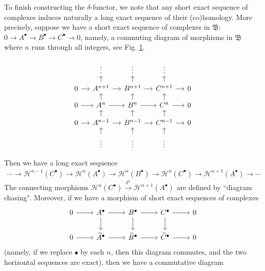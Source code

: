 \documentclass[12pt,b5paper,notitlepage]{report}
\theoremstyle{definition}
\theoremstyle{plain}
\newcommand{\fk}{\mathfrak}
\newcommand{\mc}{\mathcal}
\newcommand{\wtd}{\widetilde}
\newcommand{\blt}{\bullet}
\numberwithin{equation}{section}
\begin{document}
To finish constructing the $\delta$-functor, we note that any short exact sequence of complexes induces naturally a long exact sequence of their (co)homology. More precisely, suppose we have a short exact sequence of complexes in $\fk B$: $0\rightarrow A^\blt\rightarrow B^\blt\rightarrow C^\blt\rightarrow0$, namely, a commuting diagram  of morphisms in $\fk B$ where $n$ runs through all integers, see Fig. \ref{fig3}.
\begin{figure}[h]
	\centering
\begin{equation*}
\begin{tikzcd}[sep=small]
            & \vdots                      & \vdots                      & \vdots                      &   \\
0 \arrow[r] & A^{n+1} \arrow[r] \arrow[u] & B^{n+1} \arrow[r] \arrow[u] & C^{n+1} \arrow[r] \arrow[u] & 0 \\
0 \arrow[r] & A^n \arrow[r] \arrow[u]     & B^n \arrow[r] \arrow[u]     & C^n \arrow[r] \arrow[u]     & 0 \\
0 \arrow[r] & A^{n-1} \arrow[r] \arrow[u] & B^{n-1} \arrow[r] \arrow[u] & C^{n-1} \arrow[r] \arrow[u] & 0 \\
            & \vdots \arrow[u]            & \vdots \arrow[u]            & \vdots \arrow[u]            &  
\end{tikzcd}
\end{equation*}
\caption{}
\label{fig3}
\end{figure}
Then we have a long exact sequence
\begin{align*}
\cdots\rightarrow\mc H^{n-1}(C^\blt)\rightarrow\mc H^n(A^\blt)\rightarrow\mc H^n(B^\blt)\rightarrow\mc H^n(C^\blt)\rightarrow\mc H^{n+1}(A^\blt)\rightarrow\cdots
\end{align*}
The connecting morphisms $\mc H^n(C^\blt)\xrightarrow{\delta^n}\mc H^{n+1}(A^\blt)$ are defined by ``diagram chasing". Moreover, if we have a morphism of short exact sequences of complexes
\begin{equation*}
\begin{tikzcd}
0 \arrow[r] & A^\blt \arrow[r] \arrow[d] & B^\blt \arrow[r] \arrow[d] & C^\blt \arrow[r] \arrow[d] & 0 \\
0 \arrow[r] & \wtd A^\blt \arrow[r]      & \wtd B^\blt \arrow[r]      & \wtd C^\blt \arrow[r]      & 0
\end{tikzcd}
\end{equation*}
(namely, if we replace $\blt$ by each $n$, then this diagram commutes, and the two horizontal sequences are exact), then we have a commutative diagram
\end{document}
